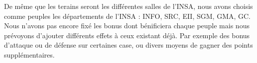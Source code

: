 De même que les terains seront les différentes salles de l'INSA, nous avons choisis comme peuples les départements de l'INSA : INFO, SRC, EII, SGM, GMA, GC. Nous n'avons pas encore fixé les bonus dont bénificiera chaque peuple mais nous prévoyons d'ajouter différents effets à ceux existant déjà. Par exemple des bonus d'attaque ou de défense sur certaines case, ou divers moyens de gagner des points supplémentaires.